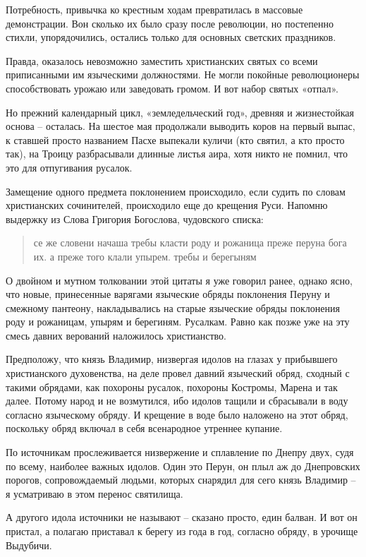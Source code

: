 Потребность, привычка ко крестным ходам превратилась в массовые демонстрации. Вон сколько их было сразу после революции, но постепенно стихли, упорядочились, остались только для основных светских праздников.

Правда, оказалось невозможно заместить христианских святых со всеми приписанными им языческими должностями. Не могли покойные революционеры способствовать урожаю или заведовать громом. И вот набор святых «отпал».

Но прежний календарный цикл, «земледельческий год», древняя и жизнестойкая основа – осталась. На шестое мая продолжали выводить коров на первый выпас, к ставшей просто названием Пасхе выпекали куличи (кто святил, а кто просто так), на Троицу разбрасывали длинные листья аира, хотя никто не помнил, что это для отпугивания русалок.

Замещение одного предмета поклонением происходило, если судить по словам христианских сочинителей, происходило еще до крещения Руси. Напомню выдержку из Слова Григория Богослова, чудовского списка:

\begin{quotation}
се же словени начаша требы класти роду и рожаница преже перуна бога их. а преже того клали упырем. требы и берегыням
\end{quotation}

О двойном и мутном толковании этой цитаты я уже говорил ранее, однако ясно, что новые, принесенные варягами языческие обряды поклонения Перуну и смежному пантеону, накладывались на старые языческие обряды поклонения роду и рожаницам, упырям и берегиням. Русалкам. Равно как позже уже на эту смесь давних верований наложилось христианство.

Предположу, что князь Владимир, низвергая идолов на глазах у прибывшего христианского духовенства, на деле провел давний языческий обряд, сходный с такими обрядами, как похороны русалок, похороны Костромы, Марена и так далее. Потому народ и не возмутился, ибо идолов тащили и сбрасывали в воду согласно языческому обряду. И крещение в воде было наложено на этот обряд, поскольку обряд включал в себя всенародное утреннее купание.

По источникам прослеживается низвержение и сплавление по Днепру двух, судя по всему, наиболее важных идолов. Один это Перун, он плыл аж до Днепровских порогов, сопровождаемый людьми, которых снарядил для сего князь Владимир – я усматриваю в этом перенос святилища. 

А другого идола источники не называют – сказано просто, един балван. И вот он пристал, а полагаю приставал к берегу из года в год, согласно обряду, в урочище Выдубичи.

